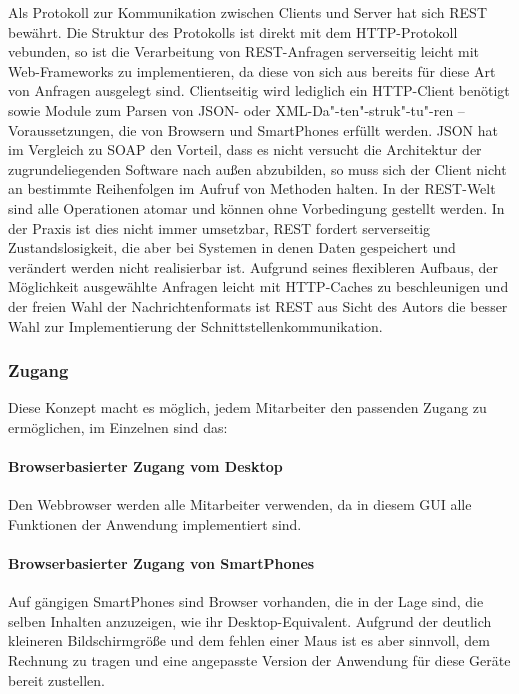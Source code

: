 Als Protokoll zur Kommunikation zwischen Clients und Server hat sich REST bewährt. Die Struktur des Protokolls ist direkt mit dem HTTP-Protokoll vebunden, so ist die Verarbeitung von REST-Anfragen serverseitig leicht mit Web-Frameworks zu implementieren, da diese von sich aus bereits für diese Art von Anfragen ausgelegt sind. Clientseitig wird lediglich ein HTTP-Client benötigt sowie Module zum Parsen von JSON- oder XML-Da"-ten"-struk"-tu"-ren -- Voraussetzungen, die von Browsern und SmartPhones erfüllt werden. JSON hat im Vergleich zu SOAP den Vorteil, dass es nicht versucht die Architektur der zugrundeliegenden Software nach außen abzubilden, so muss sich der Client nicht an bestimmte Reihenfolgen im Aufruf von Methoden halten. In der REST-Welt sind alle Operationen atomar und können ohne Vorbedingung gestellt werden. In der Praxis ist dies nicht immer umsetzbar, REST fordert serverseitig Zustandslosigkeit, die aber bei Systemen in denen Daten gespeichert und verändert werden nicht realisierbar ist. Aufgrund seines flexibleren Aufbaus, der Möglichkeit ausgewählte Anfragen leicht mit HTTP-Caches zu beschleunigen und der freien Wahl der Nachrichtenformats ist REST aus Sicht des Autors die besser Wahl zur Implementierung der Schnittstellenkommunikation.

\subsubsection{Zugang}

Diese Konzept macht es möglich, jedem Mitarbeiter den passenden Zugang zu ermöglichen, im Einzelnen sind das:

\paragraph{Browserbasierter Zugang vom Desktop} Den Webbrowser werden alle Mitarbeiter verwenden, da in diesem GUI alle Funktionen der Anwendung implementiert sind.

\paragraph{Browserbasierter Zugang von SmartPhones} Auf gängigen SmartPhones sind Browser vorhanden, die in der Lage sind, die selben Inhalten anzuzeigen, wie ihr Desktop-Equivalent. Aufgrund der deutlich kleineren Bildschirmgröße und dem fehlen einer Maus ist es aber sinnvoll, dem Rechnung zu tragen und eine angepasste Version der Anwendung für diese Geräte bereit zustellen. 

